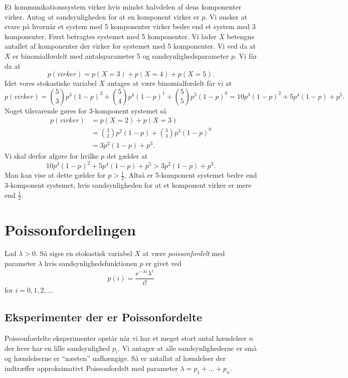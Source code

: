 \begin{eks}[Kommunikationssystemer]
  Et kommunikationssystem virker hvis mindst halvdelen af dens komponenter virker. Antag at sandsynligheden for at en komponent virker er $p$. Vi ønsker at svare på hvornår et system med 5 komponenter virker bedre end et system med 3 komponenter.
  \vspace{14pt}
  Først betragtes systemet med 5 komponenter. Vi lader $X$ betengne antallet af komponenter der virker for systemet med 5 komponenter. Vi ved da at $X$ er binomialfordelt med antalsparameter 5 og sandsynlighedsparameter $p$. Vi får da at
  \[ 
  p(virker) = p(X=3) + p(X=4) + p(X=5)
  .\]
  Idet vores stokastiske variabel $X$ antages at være binomialfordelt får vi at
  \[ 
  p(virker) = \binom{5}{3}p^3(1-p)^2 + \binom{5}{4}p^{4}(1-p)^{1} + \binom{5}{5}p^{5}(1-p)^{0} = 10p^3 (1-p)^2 + 5p^{4}(1-p) + p^{5}
  .\]
  Noget tilsvarende gøres for 3-komponent systemet så
  \begin{align*}
    p(virker) &= p(X=2) + p(X=3) \\
    &= \binom{3}{2}p^2(1-p) + \binom{3}{3}p^3(1-p)^{0} \\
    &= 3p^2(1-p) + p^3
  .\end{align*}
  Vi skal derfor afgøre for hvilke $p$ det gælder at
  \[ 
  10p^3(1-p)^2 + 5p^{4}(1-p) + p^{5} > 3p^2(1-p) + p^3
  .\]
  Man kan vise at dette gælder for $p > \frac{1}{2}$. Altså er 5-komponent systemet bedre end 3-komponent systemet, hvis sandsynligheden for at et komponent virker er mere end $\frac{1}{2}$.
\end{eks}

\section{Poissonfordelingen}
\begin{definition}
  Lad $\lambda > 0$. Så siges en stokastisk variabel $X$ at være \textit{poissonfordelt} med parameter $\lambda$ hvis sandsynlighedsfunktionen $p$ er givet ved
  \[ 
  p(i) = \frac{e^{-\lambda i}\lambda^{i}}{i!}
  \]
  for $i = 0,1,2,\ldots$
\end{definition}

\subsection{Eksperimenter der er Poissonfordelte}
Poissonfordelte eksperimenter opstår når vi har et meget stort antal hændelser $n$ der hver har en lille sandsynlighed $p_i$. Vi antager at alle sandsynlighederne er små og hændelserne er ``næsten'' uafhængige. Så er antallat af hændelser der indtræffer approksimativt Poissonfordelt med parameter $\lambda = p_1 + \ldots + p_n$. 

